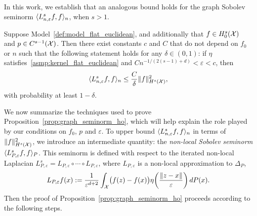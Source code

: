 In this work, we establish that an analogous bound holds for the graph Sobolev seminorm $\langle L_{n,\varepsilon}^sf, f \rangle_n$, when $s > 1$.
\begin{proposition}
	\label{prop:graph_seminorm_ho} 
	Suppose Model~\ref{def:model_flat_euclidean}, and additionally that $f \in H_0^s(\mathcal{X})$ and $p \in C^{s - 1}(\mathcal{X})$. Then there exist constants $c$ and $C$ that do not depend on $f_0$ or $n$ such that the following statement holds for any $\delta \in (0,1)$: if $\eta$ satisfies~\ref{asmp:kernel_flat_euclidean} and $Cn^{-1/(2(s - 1) + d)} < \varepsilon < c$, then
	\begin{equation}
	\label{eqn:graph_seminorm_ho}
	\langle L_{n,\varepsilon}^s f, f \rangle_n \leq \frac{C}{\delta} \|f\|_{H^s(\mathcal{X})}^2 ,
	\end{equation}
	with probability at least $1 - \delta$.
\end{proposition}
We now summarize the techniques used to prove Proposition~\ref{prop:graph_seminorm_ho}, which will help explain the role played by our conditions on $f_0$, $p$ and $\varepsilon$. To upper bound $\langle L_{n,\varepsilon}^sf, f \rangle_n$ in terms of $\|f\|_{H^s(\mathcal{X})}^2$, we introduce an intermediate quantity: the \emph{non-local Sobolev seminorm} $\langle L_{P,\varepsilon}^sf, f \rangle_{P}$. This seminorm is defined with respect to the iterated non-local Laplacian $L_{P,\varepsilon}^s = L_{P,\varepsilon} \circ \cdots \circ L_{P,\varepsilon}$, where $L_{P,\varepsilon}$ is a non-local approximation to $\Delta_P$, 
\begin{equation}
\label{eqn:nonlocal_laplacian}
L_{P,\varepsilon}f(x) := \frac{1}{\varepsilon^{d + 2}}\int_{\mathcal{X}}\bigl(f(z) - f(x)\bigr) \eta\biggl(\frac{\|z - x\|}{\varepsilon}\biggr) \,dP(x).
\end{equation}
Then the proof of Proposition~\ref{prop:graph_seminorm_ho} proceeds according to the following steps.
